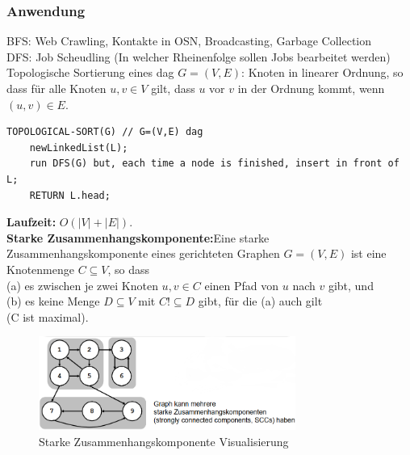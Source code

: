 \documentclass{article}
\begin{document}
            \subsubsection{Anwendung}
                BFS: Web Crawling, Kontakte in OSN, Broadcasting, Garbage Collection\\
                DFS: Job Scheudling (In welcher Rheinenfolge sollen Jobs bearbeitet werden)\\
                Topologische Sortierung eines dag $G=(V,E)$: Knoten in linearer Ordnung, so dass für alle Knoten $u,v\in V$ gilt, dass $u$ vor $v$ in der Ordnung kommt, wenn $(u,v)\in E$.
                \begin{lstlisting}[style=pseudocode]
TOPOLOGICAL-SORT(G) // G=(V,E) dag
    newLinkedList(L);
    run DFS(G) but, each time a node is finished, insert in front of L;
    RETURN L.head;
                \end{lstlisting}
                \textbf{Laufzeit:} $O(|V|+|E|)$.\\
                \textbf{Starke Zusammenhangskomponente:}Eine starke Zusammenhangskomponente eines gerichteten Graphen $G=(V,E)$ ist eine Knotenmenge $C\subseteq V$, so dass\\
                (a) es zwischen je zwei Knoten $u,v\in C$ einen Pfad von $u$ nach $v$ gibt, und\\
                (b) es keine Menge $D\subseteq V$ mit $C !\subseteq D$ gibt, für die (a) auch gilt\\
                (C ist maximal).\\
                \begin{figure}[ht]
                    \centering
                    \includegraphics[width=0.75\textwidth]{Bilder/SZK.png}
                    \caption{Starke Zusammenhangskomponente Visualisierung}
                    \label{fig:SZK}
                \end{figure}\\
\end{document}
